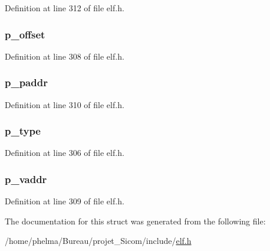 Definition at line 312 of file elf.\-h.

\hypertarget{struct_elf64___phdr_abb9049b9d526ef0716fa3903c955bf39}{
\subsubsection[{p\-\_\-offset}]{ p\-\_\-offset}}\label{struct_elf64___phdr_abb9049b9d526ef0716fa3903c955bf39}


Definition at line 308 of file elf.\-h.

\hypertarget{struct_elf64___phdr_a8f86f534551eda502922e462842a105f}{
\subsubsection[{p\-\_\-paddr}]{ p\-\_\-paddr}}\label{struct_elf64___phdr_a8f86f534551eda502922e462842a105f}


Definition at line 310 of file elf.\-h.

\hypertarget{struct_elf64___phdr_ab6106ae91030bd680b061563ad353fb9}{
\subsubsection[{p\-\_\-type}]{ p\-\_\-type}}\label{struct_elf64___phdr_ab6106ae91030bd680b061563ad353fb9}


Definition at line 306 of file elf.\-h.

\hypertarget{struct_elf64___phdr_a00f29181ec51d2d8e1b7470eebb6c3cd}{
\subsubsection[{p\-\_\-vaddr}]{ p\-\_\-vaddr}}\label{struct_elf64___phdr_a00f29181ec51d2d8e1b7470eebb6c3cd}


Definition at line 309 of file elf.\-h.



The documentation for this struct was generated from the following file\-:\begin{DoxyCompactItemize}
\item 
/home/phelma/\-Bureau/projet\-\_\-\-Sicom/include/\hyperlink{elf_8h}{elf.\-h}\end{DoxyCompactItemize}
